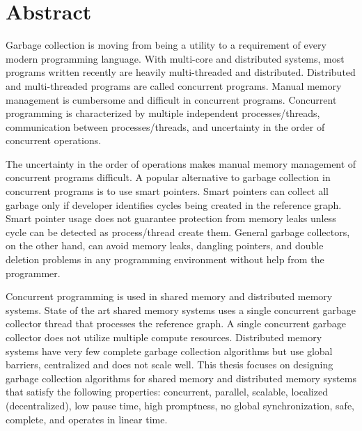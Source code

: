 \chapter*{Abstract}
\label{ch:abstract}

Garbage collection is moving from being a utility to a requirement of every modern programming language. 
With multi-core and distributed systems, most programs written recently are heavily multi-threaded and distributed. Distributed and multi-threaded programs are called concurrent programs. Manual memory management is cumbersome and difficult in concurrent programs.  Concurrent programming is characterized by multiple independent processes/threads, communication between processes/threads, and uncertainty in the order of concurrent operations.

The uncertainty in the order of operations makes manual memory management of concurrent programs difficult. 
A popular alternative to garbage collection in concurrent programs is to use smart pointers.
Smart pointers can collect all garbage only if developer identifies cycles being created in the reference graph. 
Smart pointer usage does not guarantee protection from memory leaks unless cycle can be detected as process/thread create them. General garbage collectors, on the other hand, can avoid memory leaks, dangling pointers, and double deletion problems in any programming environment without help from the programmer.

Concurrent programming is used in shared memory and distributed memory systems. State of the art shared memory systems uses a single concurrent garbage collector thread that processes the reference graph. A single concurrent garbage collector does not utilize multiple compute resources. Distributed memory systems have very few complete garbage collection algorithms but use global barriers, centralized and does not scale well. This thesis  focuses on designing garbage collection algorithms for shared memory and distributed memory systems that satisfy the following properties: concurrent, parallel, scalable, localized (decentralized), low pause time, high promptness, no global synchronization, safe, complete, and operates in linear time.

